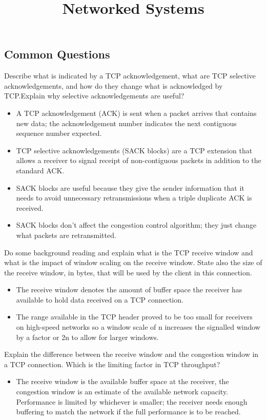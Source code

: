\documentclass{article}
\title{Networked Systems}
\author{}
\date{}
\begin{document}
\footnotesize

\subsection*{Common Questions}
Describe what is indicated by a TCP acknowledgement, what are TCP selective acknowledgements, and how do they change what is acknowledged by TCP.\@ Explain why selective acknowledgements are useful?
\begin{itemize}
    \item A TCP acknowledgement (ACK) is sent when a packet arrives that contains new data; the acknowledgement number indicates the next contiguous sequence number expected.
    \item TCP selective acknowledgements (SACK blocks) are a TCP extension that allows a receiver to signal receipt of non-contiguous packets in addition to the standard ACK.\@
    \item SACK blocks are useful because they give the sender information that it needs to avoid unnecessary retransmissions when a triple duplicate ACK is received.
    \item SACK blocks don’t affect the congestion control algorithm; they just change what packets are retransmitted.
\end{itemize}

\noindent Do some background reading and explain what is the TCP receive window and what is the impact of window scaling on the receive window. State also the size of the receive window, in bytes, that will be used by the client in this connection.
\begin{itemize}
    \item The receive window denotes the amount of buffer space the receiver has available to hold data received on a TCP connection.
    \item The range available in the TCP header proved to be too small for receivers on high-speed networks so a window scale of n increases the signalled window by a factor or 2n to allow for larger windows.
\end{itemize}

\noindent Explain the difference between the receive window and the congestion window in a TCP connection. Which is the limiting factor in TCP throughput?
\begin{itemize}
    \item The receive window is the available buffer space at the receiver, the congestion window is an estimate of the available network capacity. 
    Performance is limited by whichever is smaller; the receiver needs enough buffering to match the network if the full performance is to be reached.
\end{itemize}
\end{document}
